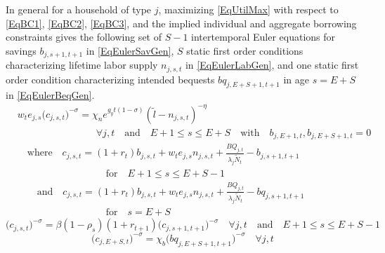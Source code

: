 \documentclass[letterpaper,12pt]{article}
\theoremstyle{definition}
\begin{document}
\begin{spacing}{1.5}
    In general for a household of type $j$, maximizing \eqref{EqUtilMax} with respect to \eqref{EqBC1}, \eqref{EqBC2}, \eqref{EqBC3}, and the implied individual and aggregate borrowing constraints gives the following set of $S-1$ intertemporal Euler equations for savings $b_{j,s+1,t+1}$ in \eqref{EqEulerSavGen}, $S$ static first order conditions characterizing lifetime labor supply $n_{j,s,t}$ in \eqref{EqEulerLabGen}, and one static first order condition characterizing intended bequests $bq_{j,E+S+1,t+1}$ in age $s=E+S$ in \eqref{EqEulerBeqGen}.
    \begin{equation}\label{EqEulerLabGen}
      \begin{split}
        &w_t e_{j,s}\bigl(c_{j,s,t}\bigr)^{-\sigma} = \chi_n e^{g_y t(1-\sigma)}(\tilde{l} - n_{j,s,t})^{-\eta} \\
        &\quad\quad\quad\quad\quad\quad\quad\quad\forall j,t \quad\text{and}\quad E+1\leq s\leq E+S \quad\text{with}\quad b_{j,E+1,t},b_{j,E+S+1,t}=0 \\
        &\quad\text{where}\quad c_{j,s,t} = \left(1+r_t\right)b_{j,s,t} + w_t e_{j,s}n_{j,s,t} + \frac{BQ_{j,t}}{\lambda_j\tilde{N}_t} - b_{j,s+1,t+1} \\
        &\quad\quad\quad\quad\quad\quad\quad\quad\quad\text{for}\quad E+1\leq s\leq E+S-1 \\
        &\quad\quad\text{and}\quad c_{j,s,t} = \left(1+r_t\right)b_{j,s,t} + w_t e_{j,s}n_{j,s,t} + \frac{BQ_{j,t}}{\lambda_j\tilde{N}_t} - bq_{j,s+1,t+1} \\
        &\quad\quad\quad\quad\quad\quad\quad\quad\quad\text{for}\quad s=E+S
      \end{split}
    \end{equation}
    \begin{equation}\label{EqEulerSavGen}
      \bigl(c_{j,s,t}\bigr)^{-\sigma} = \beta(1-\rho_s)(1+r_{t+1})\bigl(c_{j,s+1,t+1}\bigr)^{-\sigma}\quad\forall j,t \quad\text{and}\quad E+1\leq s\leq E+S-1
    \end{equation}
    \begin{equation}\label{EqEulerBeqGen}
      \bigl(c_{j,E+S,t}\bigr)^{-\sigma} = \chi_b\bigl(bq_{j,E+S+1,t+1}\bigr)^{-\sigma} \quad\forall j,t
    \end{equation}


\end{spacing}
\end{document}
